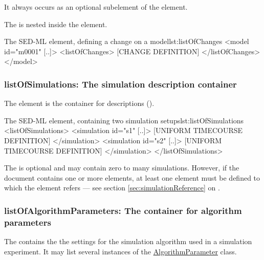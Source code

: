 
It always occurs as an optional subelement of the  element. 

The  is nested inside the  element.

\begin{myXmlLst}{The SED-ML  element, defining a change on a model}{lst:listOfChanges}
<model id="m0001" [..]>
 <listOfChanges>
  [CHANGE DEFINITION]
 </listOfChanges>
</model>
\end{myXmlLst}


\subsubsection{listOfSimulations: The simulation description container}
\label{sec:listOfSimulations}
The  element is the container for  descriptions ().



%
\begin{myXmlLst}{The SED-ML  element, containing two simulation setups}{lst:listOfSimulations}
 <listOfSimulations>
  <simulation id="s1" [..]>
   [UNIFORM TIMECOURSE DEFINITION]
  </simulation>
  <simulation id="s2" [..]>
   [UNIFORM TIMECOURSE DEFINITION]
  </simulation>
 </listOfSimulations>
\end{myXmlLst}

The  is optional and may contain zero to many simulations. However, if the \currentLV document contains one or more  elements, at least one  element must be defined to which  the  element refers --- see section \ref{sec:simulationReference} on .


\subsubsection{listOfAlgorithmParameters: The container for algorithm parameters}
\label{sec:listOfAlgorithmParameters}
The  contains the the settings for the simulation algorithm used in a simulation experiment. It may list several instances of the \hyperref[class:algorithmParameter]{AlgorithmParameter} class.

